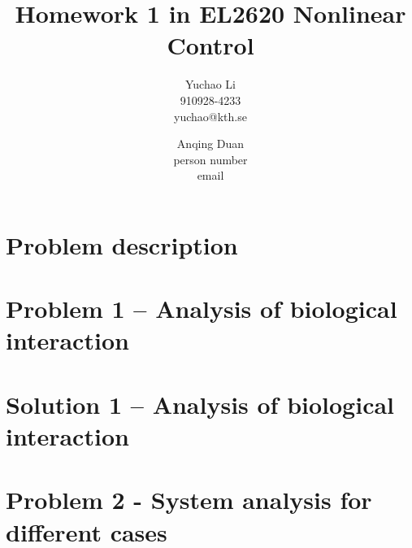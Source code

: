 \documentclass[a4paper,twocolumn]{article} %
\begin{document}

\title{Homework 1 in EL2620 Nonlinear Control}
\author{Yuchao Li \\ 910928-4233 \\ yuchao@kth.se \and Anqing Duan\\
  person number \\ email}

\maketitle                     %





\section*{Problem description}
\label{sec:prob}




\section*{Problem 1 -- Analysis of biological interaction}
\label{sec:pro1}



\section*{Solution 1 -- Analysis of biological interaction}
\label{sec:sol1}



\section*{Problem 2 - System analysis for different cases}
\label{sec:prob2}


\end{document}
